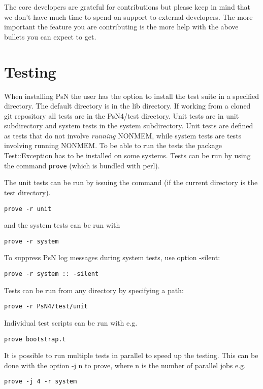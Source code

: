 The core developers are grateful for contributions but please keep in mind that we don't have much time to spend on support to external developers.
The more important the feature you are contributing is the more help with the above bullets you can expect to get.


\section{Testing}
When installing PsN the user has the option to install the test suite in a specified directory. The default directory is in the lib directory. If working from a cloned git repository all tests are in the PsN4/test directory. Unit tests are in unit subdirectory and system tests in the system subdirectory.  
Unit tests are defined as tests that do not involve \emph{running} NONMEM, while system tests are tests involving running NONMEM.  To be able to run the tests the package Test::Exception has to be installed on some systems.
Tests can be run by using the command \verb|prove| (which is bundled with perl). 

The unit tests can be run by issuing the command (if the current directory is the test directory).
\begin{verbatim}
prove -r unit
\end{verbatim}

and the system tests can be run with
\begin{verbatim}
prove -r system
\end{verbatim}

To suppress PsN log messages during system tests, use option -silent:
\begin{verbatim}
prove -r system :: -silent
\end{verbatim}

Tests can be run from any directory by specifying a path:
\begin{verbatim}
prove -r PsN4/test/unit
\end{verbatim}

Individual test scripts can be run with e.g. 
\begin{verbatim}
prove bootstrap.t
\end{verbatim}

It is possible to run multiple tests in parallel to speed up the testing. This can be done with the option -j n to prove, where n is the number of parallel jobs e.g.
\begin{verbatim}
prove -j 4 -r system
\end{verbatim}

